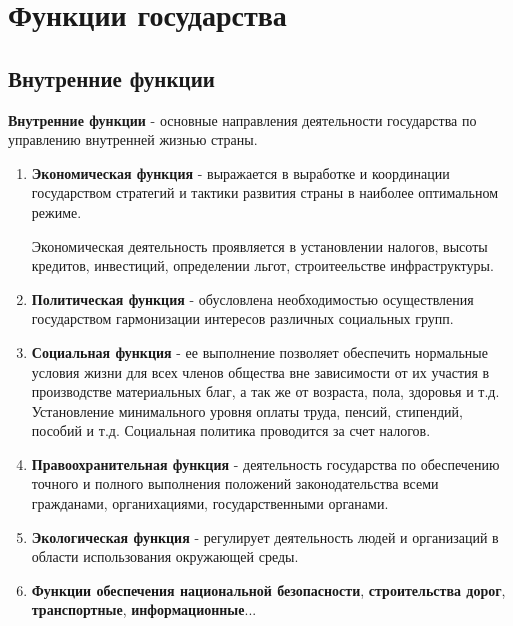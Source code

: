 \documentclass[a5paper,10pt]{article}
\begin{document}
	\section{Функции государства}
		\subsection{Внутренние функции}
			\textbf{Внутренние функции} - основные направления деятельности государства по управлению внутренней жизнью страны.

			\begin{enumerate}
				\item \textbf{Экономическая функция} - выражается в выработке и координации государством стратегий и тактики развития страны в наиболее оптимальном режиме.
				\begin{framed}
					Экономическая деятельность проявляется в установлении налогов, высоты кредитов, инвестиций, определении льгот, строитеельстве инфраструктуры.
				\end{framed}

				\item \textbf{Политическая функция} - обусловлена необходимостью осуществления государством гармонизации интересов различных социальных групп.

				\item \textbf{Социальная функция} - ее выполнение позволяет обеспечить нормальные условия жизни для всех членов общества вне зависимости от их участия в производстве материальных благ, а так же от возраста, пола, здоровья и т.д. Установление минимального уровня оплаты труда, пенсий, стипендий, пособий и т.д. Социальная политика проводится за счет налогов.

				\item \textbf{Правоохранительная функция} - деятельность государства по обеспечению точного и полного выполнения положений законодательства всеми гражданами, органихациями, государственными органами.

				\item \textbf{Экологическая функция} - регулирует деятельность людей и организаций в области использования окружающей среды.

				\item \textbf{Функции обеспечения национальной безопасности}, \textbf{строительства дорог}, \textbf{транспортные}, \textbf{информационные}...
			\end{enumerate}
\end{document}
